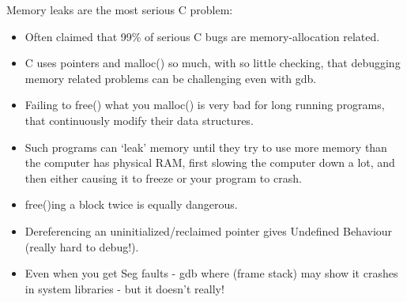 \documentclass[aspectratio=169]{beamer}
\begin{document}
\begin{frame}[fragile]
    Memory leaks are the most serious C problem:
    \begin{itemize}
      \item
      Often claimed that
      \alert{99\% of serious C bugs are memory-allocation related}.
      \item
      C uses \alert{pointers and malloc()} so much, with
      so little checking, that debugging memory related
      problems can be challenging even with gdb.
    \pause
      \item
      Failing to \alert{free() what you malloc()} is
      very bad for long running programs, that
      continuously \alert{modify their data structures}.
    \pause
      \item
      Such programs can `leak' memory until they try to use more memory than
      the computer has physical RAM, first slowing the computer down a lot,
      and then either causing it to freeze or your program to crash.
    \pause
      \item
      \alert{free()ing a block twice} is equally dangerous.
    \pause
      \item
      \alert{Dereferencing} an uninitialized/reclaimed pointer
      gives \alert{Undefined Behaviour} (really hard to debug!).
    \pause
      \item
      Even when you get \alert{Seg faults} - \alert{gdb where} (frame stack)
      may show it crashes in system libraries - but it doesn't really!
    \end{itemize}
\end{frame}
\end{document}
